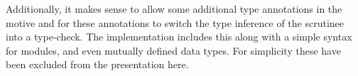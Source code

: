 Additionally, it makes sense to allow some additional type annotations in the motive and for these annotations to switch the type inference of the scrutinee into a type-check.
The implementation includes this along with a simple syntax for modules, and even mutually defined data types.
For simplicity these have been excluded from the presentation here.